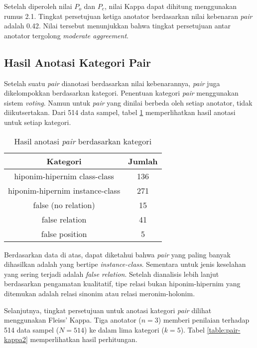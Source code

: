 \noindent Setelah diperoleh nilai $P_o$ dan $P_e$, nilai Kappa dapat dihitung menggunakan rumus 2.1. Tingkat persetujuan ketiga anotator berdasarkan nilai kebenaran \textit{pair} adalah 0.42. Nilai tersebut menunjukkan bahwa tingkat persetujuan antar anotator tergolong \textit{moderate aggreement}.

\subsection{Hasil Anotasi Kategori Pair}
Setelah suatu \textit{pair} dianotasi berdasarkan nilai kebenarannya, \textit{pair} juga dikelompokkan berdasarkan kategori. Penentuan kategori \textit{pair} menggunakan sistem \textit{voting}. Namun untuk \textit{pair} yang dinilai berbeda oleh setiap anotator, tidak diikutsertakan. Dari 514 data sampel, tabel \ref{table:anotasi-kategori} memperlihatkan hasil anotasi untuk setiap kategori.

\begin{table}
  \centering
  \caption{Hasil anotasi \textit{pair} berdasarkan kategori}
  \label{table:anotasi-kategori}
  \begin{tabular}{|c|c|}
  \hline
  Kategori & Jumlah \\ \hline
  hiponim-hipernim class-class & 136 \\ \hline
  hiponim-hipernim instance-class & 271 \\ \hline
  false (no relation) & 15 \\ \hline
  false relation & 41 \\ \hline
  false position & 5 \\ \hline
  \end{tabular} 
\end{table}

Berdasarkan data di atas, dapat diketahui bahwa \textit{pair} yang paling banyak dihasilkan adalah yang bertipe \textit{instance-class}. Sementara untuk jenis keselahan yang sering terjadi adalah \textit{false relation}. Setelah dianalisis lebih lanjut berdasarkan pengamatan kualitatif, tipe relasi bukan hiponim-hipernim yang ditemukan adalah relasi sinonim atau relasi meronim-holonim.

Selanjutnya, tingkat persetujuan untuk anotasi kategori \textit{pair} dilihat menggunakan Fleiss' Kappa. Tiga anotator ($n=3$) memberi penilaian terhadap 514 data sampel ($N=514$) ke dalam lima kategori ($k=5$). Tabel \ref{table:pair-kappa2} memperlihatkan hasil perhitungan.

